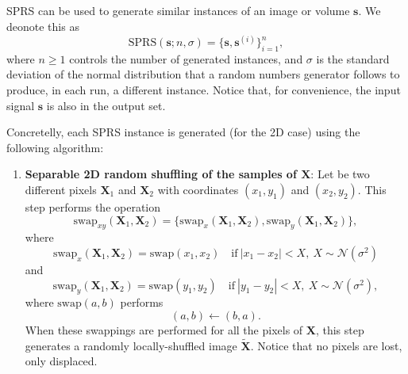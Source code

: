 \begin{subappendices}

\section{}
\label{sec:SPRS}

\acrshort{SPRS} can be used to generate similar instances of an image or volume
$\mathbf{s}$. We deonote this as
\begin{equation}
  \mathrm{SPRS}(\mathbf{s}; n, \sigma) = \{\mathbf{s}, \mathbf{s}^{(i)}\}_{i=1}^n,
\end{equation}
where $n\ge 1$ controls the number of generated instances, and
$\sigma$ is the standard deviation of the normal distribution that a
random numbers generator follows to produce, in each run, a different
instance. Notice that, for convenience, the input signal $\mathbf{s}$
is also in the output set.

Concretelly, each \gls{SPRS} instance is generated (for the 2D case) using
the following algorithm:
\begin{enumerate}
\item \textbf{Separable 2D random shuffling of the samples of
    $\mathbf{X}$}: Let be two different pixels $\mathbf{X}_1$ and
  $\mathbf{X}_2$ with coordinates $(x_1, y_1)$ and $(x_2, y_2)$. This
  step performs the operation
  \begin{equation}
    \text{swap}_{xy}(\mathbf{X}_1,\mathbf{X}_2) = \{\text{swap}_x(\mathbf{X}_1,\mathbf{X}_2), \text{swap}_y(\mathbf{X}_1,\mathbf{X}_2)\},
  \end{equation}
  where
  \begin{equation}
    \text{swap}_x(\mathbf{X}_1,\mathbf{X}_2) = \text{swap}(x_1, x_2)\quad\text{if}~|x_1-x_2|<X,~X\sim\mathcal{N}(\sigma^2)
  \end{equation}
  and
  \begin{equation}
    \text{swap}_y(\mathbf{X}_1,\mathbf{X}_2) = \text{swap}(y_1, y_2)\quad\text{if}~|y_1-y_2|<X,~X\sim\mathcal{N}(\sigma^2),
  \end{equation}
  where $\text{swap}(a,b)$ performs
  \begin{equation}
    (a,b) \leftarrow (b,a).
  \end{equation}
  When these swappings are performed for all the pixels of
  $\mathbf{X}$, this step generates a randomly locally-shuffled image
  $\tilde{\mathbf{X}}$. Notice that no pixels are lost, only displaced.


\end{enumerate}
\end{subappendices}
